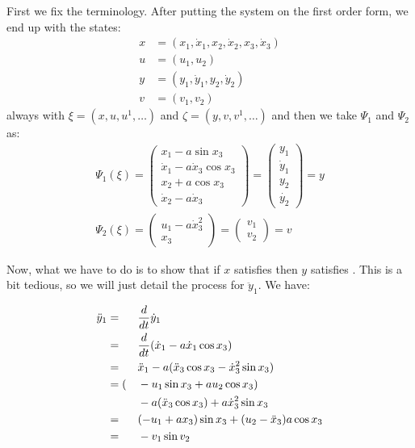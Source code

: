 \documentclass[12pt]{article}
\begin{document}
\begin{example}
  First we fix the terminology.
  After putting the system on the first order form, we end up with the states:
  \begin{align*}
    x &= (x_1,\dot{x}_1,x_2,\dot{x}_2,x_3,\dot{x}_3) \\
    u &= (u_1,u_2) \\
    y &= (y_1,\dot{y}_1,y_2,\dot{y}_2) \\
    v &= (v_1,v_2)
  \end{align*}
  always with $\xi = (x, u, u^1, \ldots)$ and $
  \zeta = (y, v, v^1, \ldots )$ and then we take $\Psi_1$ and $\Psi_2$ as:
  \begin{align*}
    \Psi_1(\xi)
    =    
    \begin{pmatrix}
      x_1 - a \sin{x_3} \\ 
      \dot{x}_1 - a \dot{x}_3 \cos{x_3} \\ 
      x_2 + a \cos{x_3} \\
      \dot{x}_2 - a \dot{x}_3
    \end{pmatrix}
    =
    \begin{pmatrix}
      y_1 \\ \dot{y}_1 \\ y_2 \\ \dot{y_2}
    \end{pmatrix}
    =
    y \\
    \Psi_2(\xi) =
    \begin{pmatrix}
      u_1 - a \dot{x}_3^2 \\ 
      x_3 
    \end{pmatrix}
    =
    \begin{pmatrix}
      v_1 \\ v_2
    \end{pmatrix}
    =
    v
  \end{align*}

  Now, what we have to do is to show that if $x$ satisfies 
  then $y$ satisfies . This is a bit tedious,
  so we will just detail the process for $\ddot{y}_1$. We have:

  \begin{alignat*}{2}
    \ddot{y}_1
    &= && \frac{d}{dt}\dot{y}_1 \\
    &= && \frac{d}{dt}(\dot{x}_1 - a \dot{x}_1 \cos{x}_3) \\
    &= && \ddot{x}_1 -a(\ddot{x}_3 \cos{x_3}-\dot{x}_3^2 \sin{x_3})\\
    &=( && -u_1\sin{x_3} + a u_2 \cos{x_3}) \\
    & &&- a(\ddot{x}_3 \cos{x_3}) + a \dot{x}_3^2\sin{x_3} \\
    &= && (-u_1 + a x_3 )\sin{x_3} + (u_2 - \ddot{x}_3 ) a \cos{x_3} \\
    &= && -v_1 \sin{v_2} \\
  \end{alignat*}


\end{example}
\end{document}
